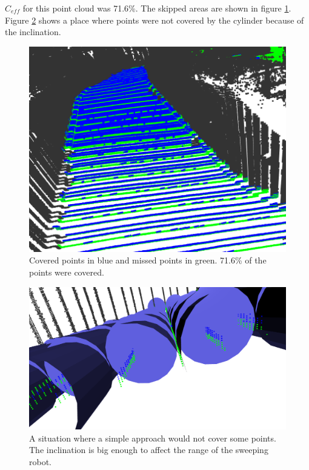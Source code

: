 $C_{eff}$ for this point cloud was 71.6\%. The skipped areas are shown in figure \ref{fig:skippedareas}. Figure \ref{fig:cylinderzoom} shows a place where points were not covered by the cylinder because of the inclination. 

\begin{figure}
    \centering
    \includegraphics[width=\textwidth]{figures/tunnelskippedpoints.png}
    \caption{Covered points in blue and missed points in green. 71.6\% of the points were covered.}
    \label{fig:skippedareas}
\end{figure}

\begin{figure}
    \centering
    \includegraphics[width=\textwidth]{figures/tunnelskippedinzoom.png}
    \caption{A situation where a simple approach would not cover some points. The inclination is big enough to affect the range of the sweeping robot.}
    \label{fig:cylinderzoom}
\end{figure}

